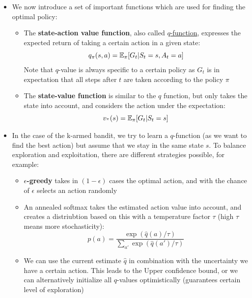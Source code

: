\begin{itemize}
	\item We now introduce a set of important functions which are used for finding the optimal policy:
	\begin{itemize}
		\item The \textbf{state-action value function}, also called \underline{$q$-function}, expresses the expected return of taking a certain action in a given state:
		$$q_{\pi}(s,a)=\mathbb{E}_{\pi}[G_t|S_t=s,A_t=a]$$
		Note that $q$-value is always specific to a certain policy as $G_t$ is in expectation that all steps after $t$ are taken according to the policy $\pi$
		\item The \textbf{state-value function} is similar to the $q$ function, but only takes the state into account, and considers the action under the expectation:
		$$v_{^\pi}(s)=\mathbb{E}_{\pi}[G_t|S_t=s]$$
	\end{itemize}

	\item In the case of the k-armed bandit, we try to learn a $q$-function (as we want to find the best action) but assume that we stay in the same state $s$. To balance exploration and exploitation, there are different strategies possible, for example:
	\begin{itemize}
		\item \textbf{$\epsilon$-greedy} takes in $(1-\epsilon)$ cases the optimal action, and with the chance of $\epsilon$ selects an action randomly
		\item An annealed softmax takes the estimated action value into account, and creates a distriubtion based on this with a temperature factor $\tau$ (high $\tau$ means more stochasticity):
		$$p(a)=\frac{\exp\left(\hat{q}(a)/\tau\right)}{\sum_{a'}\exp\left(\hat{q}(a')/\tau\right)}$$
		\item We can use the current estimate $\hat{q}$ in combination with the uncertainty we have a certain action. This leads to the Upper confidence bound, or we can alternatively initialize all $q$-values optimistically (guarantees certain level of exploration)
	\end{itemize} 


\end{itemize}
